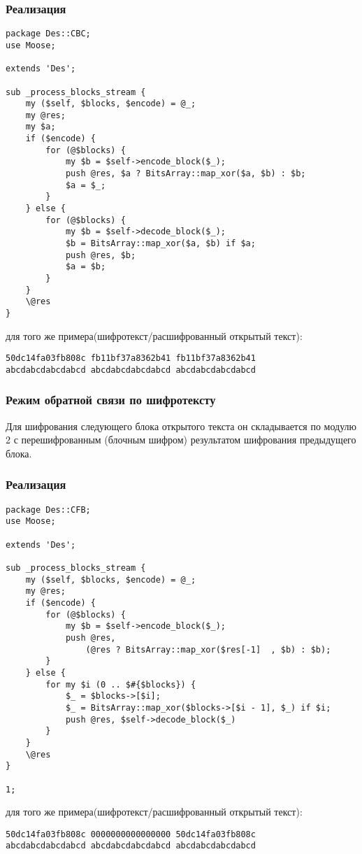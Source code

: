 \documentclass[10pt,a4paper]{article}
\begin{document}
\subsubsection*{Реализация}
\begin{lstlisting}
package Des::CBC;
use Moose;

extends 'Des';

sub _process_blocks_stream {
    my ($self, $blocks, $encode) = @_;
    my @res;
    my $a;
    if ($encode) {
        for (@$blocks) {
            my $b = $self->encode_block($_);
            push @res, $a ? BitsArray::map_xor($a, $b) : $b;
            $a = $_;
        }
    } else {
        for (@$blocks) {
            my $b = $self->decode_block($_);
            $b = BitsArray::map_xor($a, $b) if $a;
            push @res, $b;
            $a = $b;
        }
    }
    \@res
}
\end{lstlisting}
{} для того же примера(шифротекст/расшифрованный открытый
текст):
\begin{lstlisting}
50dc14fa03fb808c fb11bf37a8362b41 fb11bf37a8362b41 
abcdabcdabcdabcd abcdabcdabcdabcd abcdabcdabcdabcd 
\end{lstlisting}

\subsubsection*{Режим обратной связи по шифротексту}
Для шифрования следующего блока открытого текста он складывается по
модулю 2 с перешифрованным (блочным шифром) результатом шифрования
предыдущего блока.
\subsubsection*{Реализация}
\begin{lstlisting}
package Des::CFB;
use Moose;

extends 'Des';

sub _process_blocks_stream {
    my ($self, $blocks, $encode) = @_;
    my @res;
    if ($encode) {
        for (@$blocks) {
            my $b = $self->encode_block($_);
            push @res,
                (@res ? BitsArray::map_xor($res[-1]  , $b) : $b);
        }
    } else {
        for my $i (0 .. $#{$blocks}) {
            $_ = $blocks->[$i];
            $_ = BitsArray::map_xor($blocks->[$i - 1], $_) if $i;
            push @res, $self->decode_block($_)
        }
    }
    \@res
}

1;
\end{lstlisting}
{} для того же примера(шифротекст/расшифрованный открытый
текст):
\begin{lstlisting}
50dc14fa03fb808c 0000000000000000 50dc14fa03fb808c 
abcdabcdabcdabcd abcdabcdabcdabcd abcdabcdabcdabcd 
\end{lstlisting}
\end{document}
